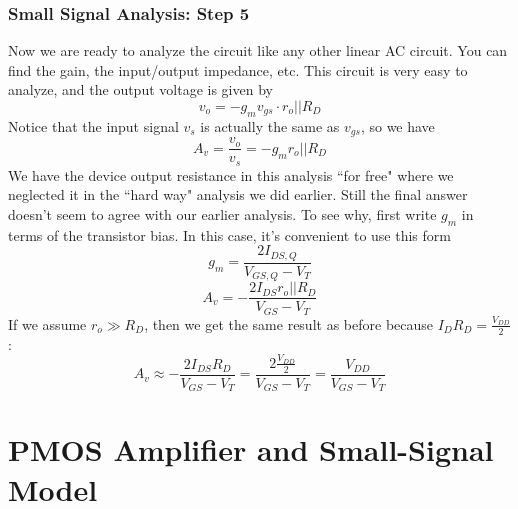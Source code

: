 \subsubsection{Small Signal Analysis:  Step 5}
Now we are ready to analyze the circuit like any other linear AC circuit.  You can find the gain, the input/output impedance, etc.  This circuit is very easy to analyze, and the output voltage is given by
    \begin{equation}
        v_o = -g_m v_{gs} \cdot r_o || R_D 
    \end{equation}
Notice that the input signal $v_s$ is actually the same as $v_{gs}$, so we have
    \begin{equation}
        A_v = \frac{v_o}{v_s} = -g_m r_o || R_D
    \end{equation}
We have the device output resistance in this analysis ``for free" where we neglected it in the ``hard way" analysis we did earlier.   Still the final answer doesn't seem to agree with our earlier analysis.  To see why, first write $g_m$ in terms of the transistor bias.  In this case, it's convenient to use this form
    \begin{equation}
        g_m = \frac{2 I_{DS,Q}}{V_{GS,Q}-V_T}
    \end{equation}
    \begin{equation}
        A_v =  -\frac{2 I_{DS} r_o||R_D}{V_{GS}-V_T}
    \end{equation}
If we assume $r_o \gg R_D$, then we get the same result as before because $I_D R_D = \frac{V_{DD}}{2}$:
    \begin{equation}
        A_v \approx  -\frac{2 I_{DS} R_D}{V_{GS}-V_T} = \frac{2\frac{V_{DD}}{2} }{V_{GS}-V_T} = \frac{V_{DD}}{V_{GS}-V_T}
    \end{equation}
\section{PMOS Amplifier and Small-Signal Model}
